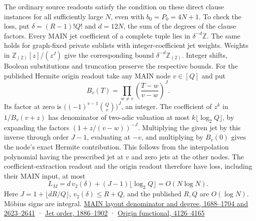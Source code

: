 \documentclass[
  11pt,
]{article}
\begin{document}
The ordinary source readouts satisfy the condition on these direct
clause instances for all sufficiently large \(N\), even with
\(b_0=P_0=4N+1\). To check the loss, put \(\delta=(R-1)!Q!\) and
\(d=12N\), the sum of the degrees of the clause factors. Every MAIN jet
coefficient of a complete tuple lies in \(\delta^{-d}\mathbb Z\). The
same holds for graph-fixed private sublists with integer-coefficient jet
weights. Weights in \(\mathbb Z_{(2)}[z]/(z^J)\) give the corresponding
bound \(\delta^{-d}\mathbb Z_{(2)}\). Integer shifts, Boolean
substitutions and truncation preserve the respective bounds. For the
published Hermite origin readout take any MAIN node \(v\in[Q]\) and put
\[
 B_v(T)=\prod_{w\ne v}\left(\frac{T-w}{v-w}\right)^J .
\] Its factor at zero is \(\bigl((-1)^{v-1}\binom Qv\bigr)^J\), an
integer. The coefficient of \(z^k\) in \(1/B_v(v+z)\) has denominator of
two-adic valuation at most \(k\lfloor\log_2 Q\rfloor\), by expanding the
factors \((1+z/(v-w))^{-J}\). Multiplying the given jet by this inverse
through order \(J-1\), evaluating at \(-v\), and multiplying by
\(B_v(0)\) gives the node's exact Hermite contribution. This follows
from the interpolation polynomial having the prescribed jet at \(v\) and
zero jets at the other nodes. The coefficient-extraction readout and the
origin readout therefore have loss, including their MAIN input, at most
\[
 L_M=d\,v_2(\delta)+(J-1)\lfloor\log_2 Q\rfloor=O(N\log N).
\] Here \(J=1+\lfloor dR/Q\rfloor\), \(v_2(\delta)\le R+Q\), and the
published \(R,Q\) are \(O(\log N)\). Möbius signs are integral.
\href{https://github.com/openai/math/blob/main/preprints/The-Exponential-Time-Hypothesis-is-False-October-25-2026/build/main_full_version.tex\#L2623}{MAIN
layout denominator and degree, 1688--1704 and 2623--2641} ·
\href{https://github.com/openai/math/blob/main/preprints/The-Exponential-Time-Hypothesis-is-False-October-25-2026/build/main_full_version.tex\#L1886}{Jet
order, 1886--1902} ·
\href{https://github.com/openai/math/blob/main/preprints/The-Exponential-Time-Hypothesis-is-False-October-25-2026/build/main_full_version.tex\#L4126}{Origin
functional, 4126--4165}
\end{document}
